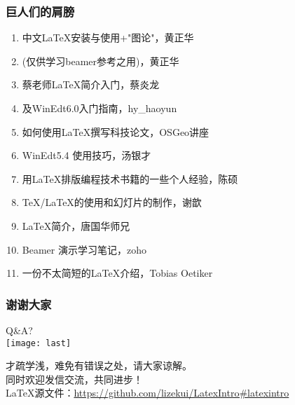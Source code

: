\begin{frame}
  \frametitle{巨人们的肩膀}
  \begin{enumerate}
    \item 中文\LaTeX{}安装与使用+"图论"，\textcolor[rgb]{0.50,0.50,1.00}{黄正华}
    \item (仅供学习beamer参考之用)，\textcolor[rgb]{0.50,0.50,1.00}{黄正华}
    \item 蔡老师\LaTeX{}简介入门，\textcolor[rgb]{0.50,0.50,1.00}{蔡炎龙}
    \item \XeLaTeX{}及WinEdt6.0入门指南，\textcolor[rgb]{0.50,0.50,1.00}{hy\_haoyun}
    \item 如何使用\LaTeX{}撰写科技论文，\textcolor[rgb]{0.50,0.50,1.00}{OSGeo讲座}
    \item WinEdt5.4 使用技巧，\textcolor[rgb]{0.50,0.50,1.00}{汤银才}
    \item 用\LaTeX{}排版编程技术书籍的一些个人经验，\textcolor[rgb]{0.50,0.50,1.00}{陈硕}
    \item \TeX{}/\LaTeX{}的使用和幻灯片的制作，\textcolor[rgb]{0.50,0.50,1.00}{谢歆}
    \item \LaTeX{}简介，\textcolor[rgb]{0.50,0.50,1.00}{唐国华师兄}
    \item Beamer 演示学习笔记，\textcolor[rgb]{0.50,0.50,1.00}{zoho}
    \item 一份不太简短的\LaTeX{}介绍，\textcolor[rgb]{0.50,0.50,1.00}{Tobias Oetiker}
  \end{enumerate}
\end{frame}

\begin{frame}
  \frametitle{谢谢大家}
  \begin{center}
    \Huge Q\&A?\\
    \texttt{[image: last]}
  \end{center}
  \begin{center}
    才疏学浅，难免有错误之处，请大家谅解。\\同时欢迎发信交流，共同进步！\\
    \footnotesize{\LaTeX{}源文件：\url{https://github.com/lizekui/LatexIntro\#latexintro}}
  \end{center}
\end{frame}
